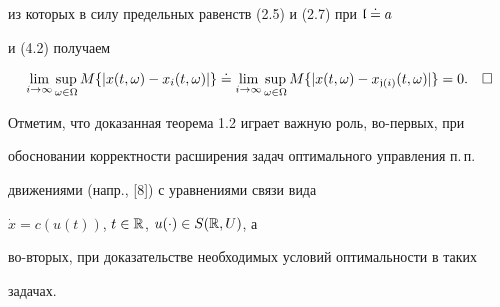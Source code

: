 из которых в силу предельных равенств (2.5) и (2.7) при $\frak l\doteq a$


и (4.2) получаем


$$


\lim\limits_{i\to\infty}\sup\limits_{\mm}M\{|x\tm-x_i\tm|\}\doteq


\lim\limits_{i\to\infty}\sup\limits_{\mm}M\{|x\tm-x_{\gj(i)}\tm|\}=0.


\quad\square


$$


\medskip





Отметим, что доказанная теорема 1.2 играет важную роль, во-первых, при


обосновании корректности расширения задач оптимального управления п.\,п.


движениями (напр., [8]) с уравнениями связи вида


$\Dot x=c(u(t))$, $t\in\Bbb R$, $u(\cdot)\in S(\Bbb R,U)$, а


во-вторых, при доказательстве необходимых условий оптимальности в таких


задачах.





